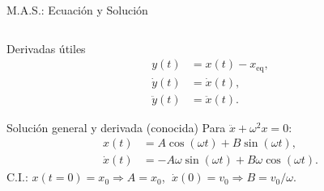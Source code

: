 \documentclass[
    10pt,
    aspectratio=169,
    xcolor={dvipsnames},
    spanish,
    ]{beamer}
\begin{document}
\begin{frame}{M.A.S.: Ecuación y Solución}
\begin{columns}[T]
\begin{column}{0.45\textwidth}
\begin{block}{Derivadas útiles}
\[\begin{aligned}
            y(t) &= x(t)-x_{\text{eq}},\\
            \dot y(t) &= \dot x(t),\\
            \ddot y(t) &= \ddot x(t).
          \end{aligned}
        \]
      \end{block}
      \begin{block}{Solución general y derivada (conocida)}
        Para $\ddot x + \omega^2 x=0$:
        \[
          \begin{aligned}
            x(t) &= A\cos(\omega t)+B\sin(\omega t),\\
            \dot x(t) &= -A\omega\sin(\omega t)+B\omega\cos(\omega t).
          \end{aligned}
        \]
        C.I.: $x(t= 0)=x_0 \Rightarrow A=x_0$, $\;\dot x(0)=v_0 \Rightarrow B=v_0/\omega$.
      \end{block}
    \end{column}
  \end{columns}
\end{frame}
\end{document}
